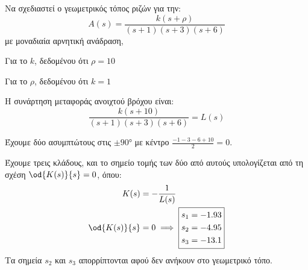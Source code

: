 \documentclass[11pt,a4paper,notitlepage,fleqn,final]{article}
\begin{document}
\begin{exercise}
Να σχεδιαστεί ο γεωμετρικός τόπος ριζών για την:
\[
A(s) = \frac{k(s+ρ)}{(s+1)(s+3)(s+6)}
\]
με μοναδιαία αρνητική ανάδραση,
\begin{enumgreekpar}
	\item Για το \( k \), δεδομένου ότι \( ρ=10 \)
	\item Για το \( ρ \), δεδομένου ότι \( k=1 \)
\end{enumgreekpar}
\tcblower
\begin{enumgreekpar}
	\item Η συνάρτηση μεταφοράς ανοιχτού βρόχου είναι:\[
	\frac{k(s+10)}{(s+1)(s+3)(s+6)} = L(s)
	\]
	
	Έχουμε δύο ασυμπτώτους στις \( \pm \ang{90} \) με κέντρο \( \frac{-1-3-6+10}{2} = 0 \).
	
    Έχουμε τρεις κλάδους, και το σημείο τομής των δύο από αυτούς υπολογίζεται από τη
    σχέση \( \od{K(s)}{s} = 0 \), όπου:
    \begin{align*}
    	K(s) &= -\frac{1}{L(s)} \\
    	\od{K(s)}{s} &= 0 \implies \boxed{\begin{aligned}
    		s_1 &= -1.93 \\ s_2 &= -4.95 \\ s_3 &= -13.1
    		\end{aligned}}
    \end{align*}
    Τα σημεία \( s_2 \) και \( s_3 \) απορρίπτονται αφού δεν ανήκουν στο γεωμετρικό τόπο.
    
\end{enumgreekpar}
\end{exercise}
\end{document}
